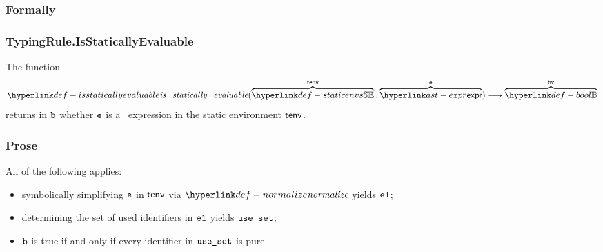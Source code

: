 \subsubsection{Formally}
\begin{mathpar}
\end{mathpar}

\begin{mathpar}
\end{mathpar}

\begin{mathpar}
\end{mathpar}

\hypertarget{def-isstaticallyevaluable}{}
\hypertarget{def-staticallyevaluable}{}
\subsubsection{TypingRule.IsStaticallyEvaluable\label{sec:TypingRule.IsStaticallyEvaluable}}
The function
\[
  \isstaticallyevaluable(\overname{\staticenvs}{\tenv} \aslsep \overname{\expr}{\ve}) \aslto
  \overname{\Bool}{\bv}
\]
returns in $\vb$ whether $\ve$ is a \staticallyevaluable\ expression in the static environment $\tenv$.

\subsubsection{Prose}
All of the following applies:
\begin{itemize}
  \item symbolically simplifying $\ve$ in $\tenv$ via $\normalize$ yields $\veone$;
  \item determining the set of used identifiers in $\veone$ yields $\useset$;
  \item $\vb$ is true if and only if every identifier in $\useset$ is pure.
\end{itemize}

